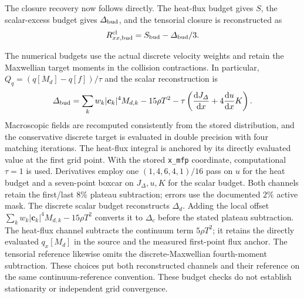\documentclass[lineno,paper]{JFM-FLM_Au}
\newenvironment{revision}{\begingroup\colorlet{shadecolor}{revisionyellow}\begin{shaded}}{\end{shaded}\endgroup}
\newenvironment{revision}{}{}
\newcommand{\cl}{\mathrm{cl}}
\begin{document}
\begin{revision}
The closure recovery now follows directly.  The heat-flux budget gives $S$, the scalar-excess budget gives $\Delta_{\rm bud}$, and the tensorial closure is reconstructed as
\begin{equation}
  R^{\cl}_{xx,\rm bud}=S_{\rm bud}-\Delta_{\rm bud}/3 .
  \label{eq:two_budget_R}
\end{equation}

The numerical budgets use the actual discrete velocity weights and retain the Maxwellian target moments in the collision contractions. In particular, $Q_q=(q[M_d]-q[f])/\tau$ and the scalar reconstruction is
\begin{equation}
\Delta_{\rm bud}=\sum_k w_k|\boldsymbol c_k|^4M_{d,k}-15\rho T^2-\tau\left(\frac{\mathrm dJ_\Delta}{\mathrm dx}+4\frac{\mathrm du}{\mathrm dx}K\right).
\end{equation}
Macroscopic fields are recomputed consistently from the stored distribution, and the conservative discrete target is evaluated in double precision with four matching iterations. The heat-flux integral is anchored by its directly evaluated value at the first grid point. With the stored \texttt{x\_mfp} coordinate, computational $\tau=1$ is used. Derivatives employ one $(1,4,6,4,1)/16$ pass on $u$ for the heat budget and a seven-point boxcar on $J_\Delta,u,K$ for the scalar budget. Both channels retain the first/last $8\%$ plateau subtraction; errors use the documented $2\%$ active mask. The discrete scalar budget reconstructs $\Delta_d$. Adding the local offset $\sum_k w_k|\boldsymbol c_k|^4M_{d,k}-15\rho T^2$ converts it to $\Delta_c$ before the stated plateau subtraction. The heat-flux channel subtracts the continuum term $5\rho T^2$; it retains the directly evaluated $q_x[M_d]$ in the source and the measured first-point flux anchor. The tensorial reference likewise omits the discrete-Maxwellian fourth-moment subtraction. These choices put both reconstructed channels and their reference on the same continuum-reference convention. These budget checks do not establish stationarity or independent grid convergence.


\end{revision}
\end{document}
